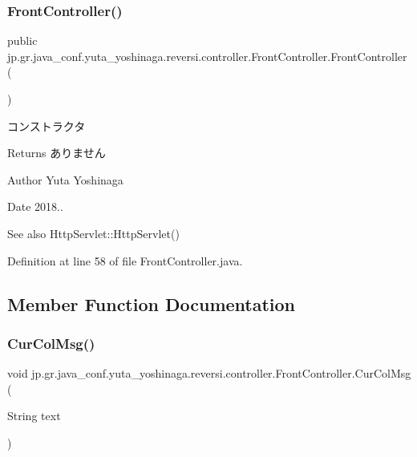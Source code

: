 \subsubsection{\texorpdfstring{Front\+Controller()}{FrontController()}}
{\footnotesize\ttfamily public jp.\+gr.\+java\+\_\+conf.\+yuta\+\_\+yoshinaga.\+reversi.\+controller.\+Front\+Controller.\+Front\+Controller (\begin{DoxyParamCaption}{ }\end{DoxyParamCaption})}



コンストラクタ 

\begin{DoxyReturn}{Returns}
ありません 
\end{DoxyReturn}
\begin{DoxyAuthor}{Author}
Yuta Yoshinaga 
\end{DoxyAuthor}
\begin{DoxyDate}{Date}
2018.. 
\end{DoxyDate}
\begin{DoxySeeAlso}{See also}
Http\+Servlet\+::\+Http\+Servlet() 
\end{DoxySeeAlso}


Definition at line 58 of file Front\+Controller.\+java.



\subsection{Member Function Documentation}
\mbox{\label{classjp_1_1gr_1_1java__conf_1_1yuta__yoshinaga_1_1reversi_1_1controller_1_1_front_controller_ac49c44c8bb767770364c52164b699110}} 
\subsubsection{\texorpdfstring{Cur\+Col\+Msg()}{CurColMsg()}}
{\footnotesize\ttfamily void jp.\+gr.\+java\+\_\+conf.\+yuta\+\_\+yoshinaga.\+reversi.\+controller.\+Front\+Controller.\+Cur\+Col\+Msg (\begin{DoxyParamCaption}\item[{String}]{text }\end{DoxyParamCaption})}



